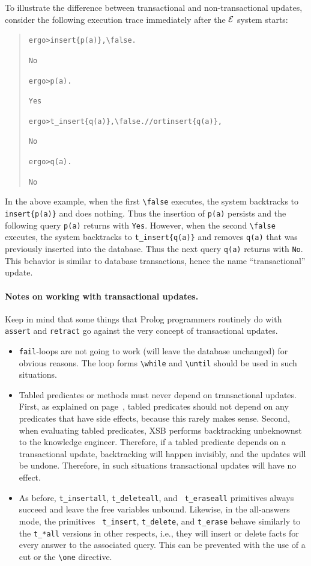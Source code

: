 \documentclass[11pt]{article}
\newcommand{\ERGO}{\mbox{\ensuremath{\cal{E}}\smaller{{\sc{RGO}}}}\xspace}
\newcommand{\FLSYSTEM}{\ERGO}
\newcommand{\prompt}{ergo> }
\newcommand{\bs}{\textbackslash}
\begin{document}
To illustrate the difference between transactional and
non-transactional updates, consider the following execution trace
immediately after the \FLSYSTEM system starts:
\begin{quote}
\begin{alltt}
\prompt insert\{p(a)\}, \bs{}false.

No

\prompt p(a).

Yes

\prompt t_insert\{q(a)\}, \bs{}false.   // or tinsert\{q(a)\},

No

\prompt q(a).

No
\end{alltt}
\end{quote}
In the above example, when the first \verb|\false| executes, the system
backtracks to {\tt insert\{p(a)\}} and does nothing. Thus the insertion
of {\tt p(a)} persists and the following query \verb|p(a)| returns
with {\tt Yes}. However, when the second \verb|\false| executes, the
system backtracks to {\tt t\_insert\{q(a)\}} and removes {\tt q(a)} that
was previously inserted into the database. Thus the next query
\verb|q(a)| returns with {\tt No}. This behavior is similar to database
transactions, hence the name ``transactional'' update.

\paragraph{Notes on working with transactional updates.}
Keep in mind that some things that Prolog programmers routinely do with
{\tt assert} and {\tt retract} go against the very concept of
transactional updates.
\begin{itemize}
  \item
    {\tt fail}-loops are not going to
    work (will leave the database unchanged) for obvious reasons. The loop forms
    {\tt \bs{}while} and {\tt \bs{}until} should be used in such situations.
  \item Tabled predicates or methods must never depend on transactional
    updates. First, as explained on page~\pageref{page-depchk},
    tabled predicates should not depend on any predicates that have side
    effects, because this rarely makes sense. Second, when evaluating
    tabled predicates, XSB performs backtracking unbeknownst to the
    knowledge engineer. Therefore, if a tabled predicate depends on a
    transactional update, backtracking will happen invisibly, and the
    updates will be undone. Therefore, in such situations transactional
    updates will have no effect.
    
  \item As before, {\tt t\_insertall}, {\tt t\_deleteall}, and {\tt
      t\_eraseall} primitives always succeed and leave the free variables
    unbound.  Likewise, in the all-answers mode, the primitives {\tt
      t\_insert}, {\tt t\_delete}, and {\tt t\_erase} behave similarly to the
    {\tt t\_*all} versions in other respects, i.e., they will insert
    or delete facts for every answer to the associated query. This can be
    prevented with the use of a cut or the {\tt \bs{}one} directive.
\end{itemize}
\end{document}

